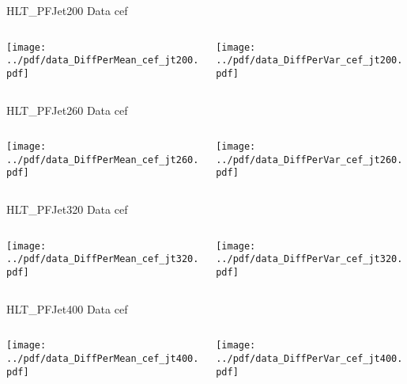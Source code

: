 \documentclass[9pt]{beamer}
\begin{document}
\begin{frame}[t]{HLT\_PFJet200 Data cef}
\begin{columns}[T]
  \begin{column}{.5\textwidth}
  \texttt{[image: ../pdf/data\_DiffPerMean\_cef\_jt200.pdf]}
  \end{column}
  \begin{column}{.5\textwidth}
  \texttt{[image: ../pdf/data\_DiffPerVar\_cef\_jt200.pdf]}
  \end{column}
\end{columns}
\end{frame}

\begin{frame}[t]{HLT\_PFJet260 Data cef}
\begin{columns}[T]
  \begin{column}{.5\textwidth}
  \texttt{[image: ../pdf/data\_DiffPerMean\_cef\_jt260.pdf]}
  \end{column}
  \begin{column}{.5\textwidth}
  \texttt{[image: ../pdf/data\_DiffPerVar\_cef\_jt260.pdf]}
  \end{column}
\end{columns}
\end{frame}

\begin{frame}[t]{HLT\_PFJet320 Data cef}
\begin{columns}[T]
  \begin{column}{.5\textwidth}
  \texttt{[image: ../pdf/data\_DiffPerMean\_cef\_jt320.pdf]}
  \end{column}
  \begin{column}{.5\textwidth}
  \texttt{[image: ../pdf/data\_DiffPerVar\_cef\_jt320.pdf]}
  \end{column}
\end{columns}
\end{frame}

\begin{frame}[t]{HLT\_PFJet400 Data cef}
\begin{columns}[T]
  \begin{column}{.5\textwidth}
  \texttt{[image: ../pdf/data\_DiffPerMean\_cef\_jt400.pdf]}
  \end{column}
  \begin{column}{.5\textwidth}
  \texttt{[image: ../pdf/data\_DiffPerVar\_cef\_jt400.pdf]}
  \end{column}
\end{columns}
\end{frame}
\end{document}
